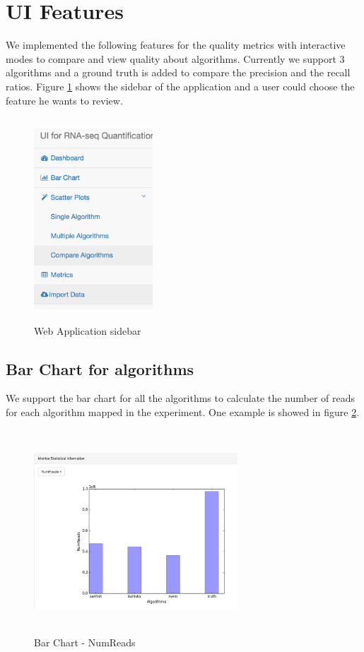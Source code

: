 \documentclass[11pt,letter]{article}
\begin{document}
\section {UI Features}
We implemented the following features for the quality metrics with interactive modes to compare and view quality about algorithms. Currently we support 3 algorithms and a ground truth is added to compare the precision and the recall ratios. Figure \ref{fig:sidebar} shows the sidebar of the application and a user could choose the feature he wants to review.
\begin{figure}[h!]
\centering
\includegraphics[height=3in, width=1.75in]{./fig/sidebar.png}
\caption{Web Application sidebar}
\label{fig:sidebar}
\end{figure}

\subsection {Bar Chart for algorithms}
We support the bar chart for all the algorithms to calculate the number of reads for each algorithm mapped in the experiment. One example is showed in figure \ref{fig:barchart_numreads}.

\begin{figure}[h!]
\centering
\includegraphics[height=3in, width=3in]{./fig/barchar_numreads.jpg}
\caption{Bar Chart - NumReads}
\label{fig:barchart_numreads}
\end{figure}
\end{document}
